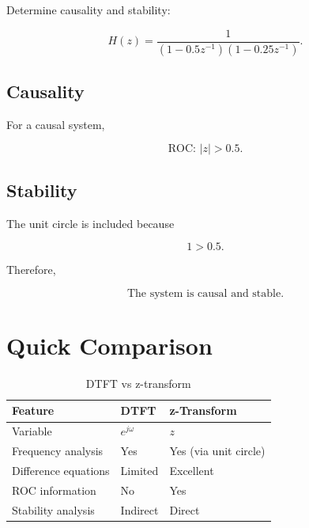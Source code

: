 Determine causality and stability:

\[
H(z)=
\frac{1}{(1-0.5z^{-1})(1-0.25z^{-1})}.
\]


\subsection{Causality}

For a causal system,

\[
\text{ROC: }|z|>0.5.
\]


\subsection{Stability}

The unit circle is included because

\[
1>0.5.
\]

Therefore,

\[
\boxed{
\text{The system is causal and stable.}
}
\]


\section{Quick Comparison}

\begin{table}[H]
\centering
\caption{DTFT vs z-transform}
\begin{tabular}{|p{5cm}|p{4cm}|p{4cm}|}
\hline
\textbf{Feature} & \textbf{DTFT} & \textbf{z-Transform}\\
\hline
Variable & \(e^{j\omega}\) & \(z\)\\
\hline
Frequency analysis & Yes & Yes (via unit circle)\\
\hline
Difference equations & Limited & Excellent\\
\hline
ROC information & No & Yes\\
\hline
Stability analysis & Indirect & Direct\\
\hline
\end{tabular}
\end{table}


